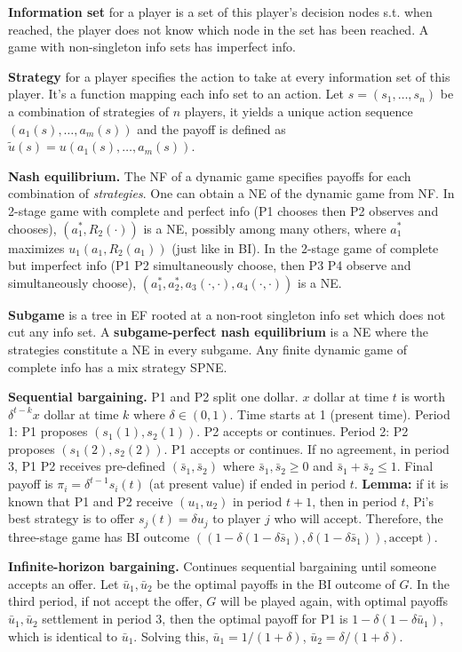 \documentclass[a4paper,11pt,landscape]{article}
\begin{document}
\begin{multicols*}{3}
\textbf{Information set} for a player is a set of this player's decision nodes s.t. when reached, the player does not know which node in the set has been reached. A game with non-singleton info sets has imperfect info.

\textbf{Strategy} for a player specifies the action to take at every information set of this player. It's a function mapping each info set to an action. Let $s=(s_1,\ldots,s_n)$ be a combination of strategies of $n$ players, it yields a unique action sequence $(a_1(s),\ldots,a_m(s))$ and the payoff is defined as $\tilde{u}(s)=u(a_1(s),\ldots,a_m(s))$.

\textbf{Nash equilibrium.} The NF of a dynamic game specifies payoffs for each combination of \textit{strategies}. One can obtain a NE of the dynamic game from NF. In 2-stage game with complete and perfect info (P1 chooses then P2 observes and chooses), $(a_1^*,R_2(\cdot))$ is a NE, possibly among many others, where $a_1^*$ maximizes $u_1(a_1,R_2(a_1))$ (just like in BI). In the 2-stage game of complete but imperfect info (P1 P2 simultaneously choose, then P3 P4 observe and simultaneously choose), $(a_1^*,a_2^*,a_3(\cdot,\cdot),a_4(\cdot,\cdot))$ is a NE.

\textbf{Subgame} is a tree in EF rooted at a non-root singleton info set which does not cut any info set. A \textbf{subgame-perfect nash equilibrium} is a NE where the strategies constitute a NE in every subgame. Any finite dynamic game of complete info has a mix strategy SPNE.

\textbf{Sequential bargaining.} P1 and P2 split one dollar. $x$ dollar at time $t$ is worth $\delta^{t-k}x$ dollar at time $k$ where $\delta\in(0,1)$. Time starts at 1 (present time). Period 1: P1 proposes $(s_1(1),s_2(1))$. P2 accepts or continues. Period 2: P2 proposes $(s_1(2),s_2(2))$. P1 accepts or continues. If no agreement, in period 3, P1 P2 receives pre-defined $(\bar{s}_1,\bar s_2)$ where $\bar s_1,\bar s_2\geq0$ and $\bar s_1+\bar s_2\leq 1$. Final payoff  is $\pi_i=\delta^{t-1}s_i(t)$ (at present value) if ended in period $t$. \textbf{Lemma:} if it is known that P1 and P2 receive $(u_1,u_2)$ in period $t+1$, then in period $t$, Pi's best strategy is to offer $s_j(t)=\delta u_j$ to player $j$ who will accept. Therefore, the three-stage game has BI outcome $((1-\delta(1-\delta\bar s_1), \delta(1-\delta\bar s_1)), \text{accept})$.

\textbf{Infinite-horizon bargaining.} Continues sequential bargaining until someone accepts an offer. Let $\bar u_1,\bar u_2$ be the optimal payoffs in the BI outcome of $G$. In the third period, if not accept the offer, $G$ will be played again, with optimal payoffs $\bar u_1,\bar u_2$ settlement in period 3, then the optimal payoff for P1 is $1-\delta(1-\delta \bar u_1)$, which is identical to $\bar u_1$. Solving this, $\bar u_1=1/(1+\delta)$, $\bar u_2=\delta/(1+\delta)$.


\end{multicols*}
\end{document}
